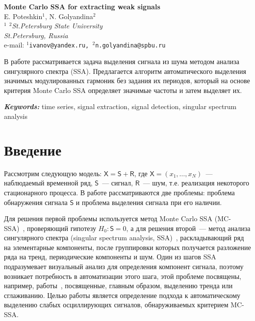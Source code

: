\documentclass[12pt]{article}
\providecommand{\keywords}[1]
{
\vspace{2mm}\hspace{20pt}\textbf{\textit{Keywords:}} #1
}
\providecommand{\abskeyw}[2]
{
\begin{small}
\begin{adjustwidth}{10mm}{10mm}
\vspace{1mm}\hspace{20pt}#1

\keywords{#2}
\end{adjustwidth}
\end{small}
}
\begin{document}
\begin{center}
{\Large\bf Monte Carlo SSA for extracting weak signals}\\\vspace{2mm} {\sc E. Poteshkin$^1$, N. Golyandina$^2$}\\\vspace{2mm}
{\it $^{1}$ $^{2}$St.Petersburg State University\\
St.Petersburg, Russia\\} e-mail: {\tt $^1$ivanov@yandex.ru,
$^2$n.golyandina@spbu.ru}

\abskeyw{В работе рассматривается задача выделения сигнала из шума методом анализа сингулярного спектра (SSA). Предлагается алгоритм автоматического выделения значимых модулированных гармоник без задания их периодов, который на основе критерия Monte Carlo SSA определяет значимые частоты и затем выделяет их.}{time series, signal extraction, signal detection, singular spectrum analysis}
\end{center}

\section{Введение}

Рассмотрим следующую модель: $\mathsf{X}=\mathsf{S}+\mathsf{R}$, где $\mathsf{X} = (x_1,\ldots,x_N)$~--- наблюдаемый временной ряд, $\mathsf{S}$~--- сигнал, $\mathsf{R}$~--- шум, т.е. реализация некоторого стационарного процесса. В работе рассматриваются две проблемы: проблема обнаружения сигнала $\mathsf{S}$ и проблема выделения сигнала при его наличии.

Для решения первой проблемы используется метод Monte Carlo SSA (MC-SSA)~\cite{AllenSmith96}, проверяющий гипотезу $H_0:\mathsf{S}=0$, а для решения второй~--- метод анализа сингулярного спектра (singular spectrum analysis, SSA)~\cite{Broomhead1986, ssa2001}, раскладывающий ряд на элементарные компоненты, после группировки которых получается разложение ряда на тренд, периодические компоненты и шум. Один из шагов SSA подразумевает визуальный анализ для определения компонент сигнала, поэтому возникает потребность в автоматизации этого шага, этой проблеме посвящены, например, работы~\cite{alexandrov, Kalantari2019, circSSA, autoSSA}, посвященные, главным образом, выделению тренда или сглаживанию. Целью работы является определение подхода к автоматическому выделению слабых осциллирующих сигналов, обнаруживаемых критерием MC-SSA.
\end{document}
